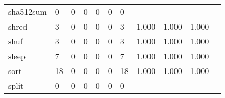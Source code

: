\begin{longtable}{lp{1.20cm}p{1.20cm}p{1.20cm}p{1.20cm}p{1.20cm}p{1.20cm}p{1.20cm}p{1.20cm}p{1.20cm}p{1.20cm}}
sha512sum &                                     0 &                                                  0 &                                                  0 &                                                  0 &                                                  0 &                                                  0 &                                             - &                                                  - &                                                  - \\
shred     &                                     3 &                                                  0 &                                                  0 &                                                  0 &                                                  0 &                                                  3 &                                         1.000 &                                              1.000 &                                              1.000 \\
shuf      &                                     3 &                                                  0 &                                                  0 &                                                  0 &                                                  0 &                                                  3 &                                         1.000 &                                              1.000 &                                              1.000 \\
sleep     &                                     7 &                                                  0 &                                                  0 &                                                  0 &                                                  0 &                                                  7 &                                         1.000 &                                              1.000 &                                              1.000 \\
sort      &                                    18 &                                                  0 &                                                  0 &                                                  0 &                                                  0 &                                                 18 &                                         1.000 &                                              1.000 &                                              1.000 \\
split     &                                     0 &                                                  0 &                                                  0 &                                                  0 &                                                  0 &                                                  0 &                                             - &                                                  - &                                                  - \\

\end{longtable}
